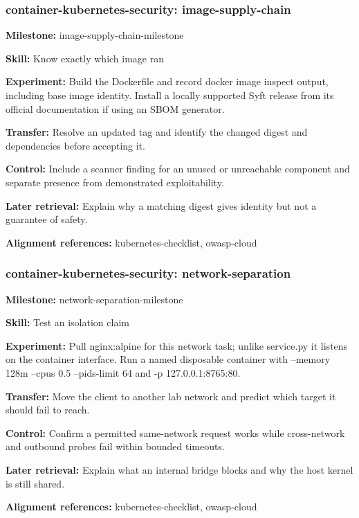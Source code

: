 \subsubsection{container-kubernetes-security: image-supply-chain}
\noindent\textbf{Milestone:} image-supply-chain-milestone\par
\noindent\textbf{Skill:} Know exactly which image ran\par
\noindent\textbf{Experiment:} Build the Dockerfile and record docker image inspect output, including base image identity. Install a locally supported Syft release from its official documentation if using an SBOM generator.\par
\noindent\textbf{Transfer:} Resolve an updated tag and identify the changed digest and dependencies before accepting it.\par
\noindent\textbf{Control:} Include a scanner finding for an unused or unreachable component and separate presence from demonstrated exploitability.\par
\noindent\textbf{Later retrieval:} Explain why a matching digest gives identity but not a guarantee of safety.\par
\noindent\textbf{Alignment references:} kubernetes-checklist, owasp-cloud\par
\subsubsection{container-kubernetes-security: network-separation}
\noindent\textbf{Milestone:} network-separation-milestone\par
\noindent\textbf{Skill:} Test an isolation claim\par
\noindent\textbf{Experiment:} Pull nginx:alpine for this network task; unlike service.py it listens on the container interface. Run a named disposable container with --memory 128m --cpus 0.5 --pids-limit 64 and -p 127.0.0.1:8765:80.\par
\noindent\textbf{Transfer:} Move the client to another lab network and predict which target it should fail to reach.\par
\noindent\textbf{Control:} Confirm a permitted same-network request works while cross-network and outbound probes fail within bounded timeouts.\par
\noindent\textbf{Later retrieval:} Explain what an internal bridge blocks and why the host kernel is still shared.\par
\noindent\textbf{Alignment references:} kubernetes-checklist, owasp-cloud\par
